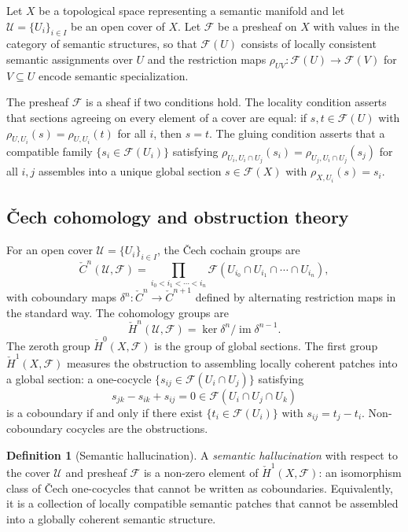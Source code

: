 \documentclass[12pt, a4paper]{article}
\theoremstyle{plain}
\theoremstyle{definition}
\newtheorem{definition}[theorem]{Definition}
\theoremstyle{remark}
\begin{document}
Let $X$ be a topological space representing a semantic manifold and let
$\mathcal{U} = \{U_i\}_{i \in I}$ be an open cover of $X$. Let $\mathcal{F}$ be a
presheaf on $X$ with values in the category of semantic structures, so that
$\mathcal{F}(U)$ consists of locally consistent semantic assignments over $U$ and
the restriction maps $\rho_{UV} : \mathcal{F}(U) \to \mathcal{F}(V)$ for $V \subseteq U$
encode semantic specialization.

The presheaf $\mathcal{F}$ is a sheaf if two conditions hold. The locality condition
asserts that sections agreeing on every element of a cover are equal: if $s, t \in
\mathcal{F}(U)$ with $\rho_{U, U_i}(s) = \rho_{U, U_i}(t)$ for all $i$, then $s = t$.
The gluing condition asserts that a compatible family $\{s_i \in \mathcal{F}(U_i)\}$
satisfying $\rho_{U_i, U_i \cap U_j}(s_i) = \rho_{U_j, U_i \cap U_j}(s_j)$ for all
$i, j$ assembles into a unique global section $s \in \mathcal{F}(X)$ with
$\rho_{X, U_i}(s) = s_i$.

\subsection{\v{C}ech cohomology and obstruction theory}

For an open cover $\mathcal{U} = \{U_i\}_{i \in I}$, the \v{C}ech cochain groups are
\[
  \check{C}^n(\mathcal{U}, \mathcal{F})
  = \prod_{i_0 < i_1 < \cdots < i_n} \mathcal{F}(U_{i_0} \cap U_{i_1} \cap \cdots
  \cap U_{i_n}),
\]
with coboundary maps $\delta^n : \check{C}^n \to \check{C}^{n+1}$ defined by
alternating restriction maps in the standard way. The cohomology groups are
\[
  \check{H}^n(\mathcal{U}, \mathcal{F}) = \ker \delta^n / \operatorname{im} \delta^{n-1}.
\]
The zeroth group $\check{H}^0(X, \mathcal{F})$ is the group of global sections.
The first group $\check{H}^1(X, \mathcal{F})$ measures the obstruction to assembling
locally coherent patches into a global section: a one-cocycle $\{s_{ij} \in
\mathcal{F}(U_i \cap U_j)\}$ satisfying
\[
  s_{jk} - s_{ik} + s_{ij} = 0 \in \mathcal{F}(U_i \cap U_j \cap U_k)
\]
is a coboundary if and only if there exist $\{t_i \in \mathcal{F}(U_i)\}$ with
$s_{ij} = t_j - t_i$. Non-coboundary cocycles are the obstructions.

\begin{definition}[Semantic hallucination]
  A \emph{semantic hallucination} with respect to the cover $\mathcal{U}$ and
  presheaf $\mathcal{F}$ is a non-zero element of $\check{H}^1(X, \mathcal{F})$:
  an isomorphism class of \v{C}ech one-cocycles that cannot be written as coboundaries.
  Equivalently, it is a collection of locally compatible semantic patches that cannot
  be assembled into a globally coherent semantic structure.
\end{definition}
\end{document}
